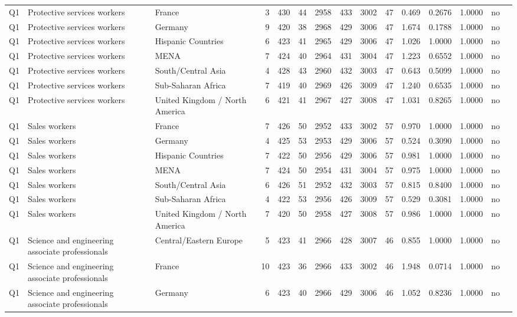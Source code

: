 \begin{longtable}{lllrcccccccccll}
Q1 & Protective services workers & France & 3 & 430 & 44 & 2958 & 433 & 3002 & 47 & 0.469 & 0.2676 & 1.0000 & no \\
Q1 & Protective services workers & Germany & 9 & 420 & 38 & 2968 & 429 & 3006 & 47 & 1.674 & 0.1788 & 1.0000 & no \\
Q1 & Protective services workers & Hispanic Countries & 6 & 423 & 41 & 2965 & 429 & 3006 & 47 & 1.026 & 1.0000 & 1.0000 & no \\
Q1 & Protective services workers & MENA & 7 & 424 & 40 & 2964 & 431 & 3004 & 47 & 1.223 & 0.6552 & 1.0000 & no \\
Q1 & Protective services workers & South/Central Asia & 4 & 428 & 43 & 2960 & 432 & 3003 & 47 & 0.643 & 0.5099 & 1.0000 & no \\
Q1 & Protective services workers & Sub-Saharan Africa & 7 & 419 & 40 & 2969 & 426 & 3009 & 47 & 1.240 & 0.6535 & 1.0000 & no \\
Q1 & Protective services workers & United Kingdom / North America & 6 & 421 & 41 & 2967 & 427 & 3008 & 47 & 1.031 & 0.8265 & 1.0000 & no \\
Q1 & Sales workers & France & 7 & 426 & 50 & 2952 & 433 & 3002 & 57 & 0.970 & 1.0000 & 1.0000 & no \\
Q1 & Sales workers & Germany & 4 & 425 & 53 & 2953 & 429 & 3006 & 57 & 0.524 & 0.3090 & 1.0000 & no \\
Q1 & Sales workers & Hispanic Countries & 7 & 422 & 50 & 2956 & 429 & 3006 & 57 & 0.981 & 1.0000 & 1.0000 & no \\
Q1 & Sales workers & MENA & 7 & 424 & 50 & 2954 & 431 & 3004 & 57 & 0.975 & 1.0000 & 1.0000 & no \\
Q1 & Sales workers & South/Central Asia & 6 & 426 & 51 & 2952 & 432 & 3003 & 57 & 0.815 & 0.8400 & 1.0000 & no \\
Q1 & Sales workers & Sub-Saharan Africa & 4 & 422 & 53 & 2956 & 426 & 3009 & 57 & 0.529 & 0.3081 & 1.0000 & no \\
Q1 & Sales workers & United Kingdom / North America & 7 & 420 & 50 & 2958 & 427 & 3008 & 57 & 0.986 & 1.0000 & 1.0000 & no \\
Q1 & Science and engineering associate professionals & Central/Eastern Europe & 5 & 423 & 41 & 2966 & 428 & 3007 & 46 & 0.855 & 1.0000 & 1.0000 & no \\
Q1 & Science and engineering associate professionals & France & 10 & 423 & 36 & 2966 & 433 & 3002 & 46 & 1.948 & 0.0714 & 1.0000 & no \\
Q1 & Science and engineering associate professionals & Germany & 6 & 423 & 40 & 2966 & 429 & 3006 & 46 & 1.052 & 0.8236 & 1.0000 & no \\

\end{longtable}
